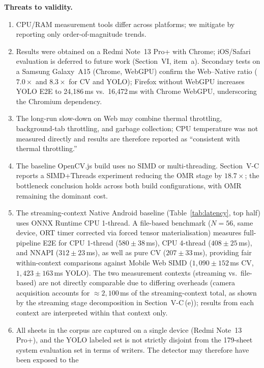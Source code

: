 \documentclass[conference]{IEEEtran}
\begin{document}
\textbf{Threats to validity.}
\label{sec:threats}
\begin{enumerate}[label=(\roman*), leftmargin=*, itemsep=2pt, topsep=4pt]
  \item CPU/RAM measurement tools differ across platforms; we mitigate
    by reporting only order-of-magnitude trends.
  \item Results were obtained on a Redmi Note~13 Pro+ with Chrome;
    iOS/Safari evaluation is deferred to future work (Section~VI,
    item~a). Secondary tests on a Samsung Galaxy~A15 (Chrome, WebGPU)
    confirm the Web--Native ratio ($7.0\times$ and $8.3\times$ for CV
    and YOLO); Firefox without WebGPU increases YOLO E2E to 24,186\,ms
    vs.\ 16,472\,ms with Chrome WebGPU, underscoring the Chromium
    dependency.
  \item The long-run slow-down on Web may combine thermal throttling,
    background-tab throttling, and garbage collection; CPU temperature
    was not measured directly and results are therefore reported as
    ``consistent with thermal throttling.''
  \item The baseline OpenCV.js build uses no SIMD or multi-threading.
    Section~V-C reports a SIMD+Threads experiment reducing the OMR
    stage by $18.7\times$; the bottleneck conclusion holds across both
    build configurations, with OMR remaining the dominant cost.
  \item The streaming-context Native Android baseline (Table~\ref{tab:latency},
    top half) uses ONNX Runtime CPU 1-thread. A file-based benchmark
    ($N=56$, same device, ORT timer corrected via forced tensor
    materialisation) measures full-pipeline E2E for CPU 1-thread
    ($580\pm38$\,ms), CPU 4-thread ($408\pm25$\,ms), and NNAPI
    ($312\pm23$\,ms), as well as pure CV ($207\pm33$\,ms), providing
    fair within-context comparisons against Mobile Web SIMD
    ($1{,}090\pm152$\,ms CV, $1{,}423\pm163$\,ms YOLO).
    The two measurement contexts (streaming vs.\ file-based) are not
    directly comparable due to differing overheads (camera acquisition
    accounts for $\approx2{,}100$\,ms of the streaming-context total,
    as shown by the streaming stage decomposition in Section~V-C\,(e));
    results from each context are interpreted within that context only.
  \item All sheets in the corpus are captured on a single device
    (Redmi Note~13 Pro+), and the YOLO labeled set is not strictly
    disjoint from the 179-sheet system evaluation set in terms of
    writers. The detector may therefore have been exposed to the

\end{enumerate}
\end{document}
